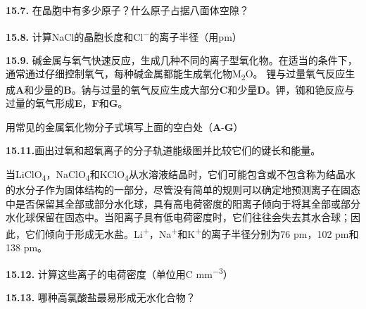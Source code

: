 \noindent\textbf{15.7.} 在晶胞中有多少原子？什么原子占据八面体空隙？

\noindent\textbf{15.8.}
计算NaCl的晶胞长度和Cl\textsuperscript{−}的离子半径（用pm）

\noindent\textbf{15.9.}
碱金属与氧气快速反应，生成几种不同的离子型氧化物。在适当的条件下，通常通过仔细控制氧气，每种碱金属都能生成氧化物M\textsubscript{2}O。
锂与过量氧气反应生成\textbf{A}和少量的\textbf{B}。钠与过量的氧气反应生成大部分\textbf{C}和少量\textbf{D}。钾，铷和铯反应与过量的氧气形成\textbf{E}，\textbf{F}和\textbf{G}。

用常见的金属氧化物分子式填写上面的空白处（\textbf{A}-\textbf{G}）

\noindent\textbf{15.11.}画出过氧和超氧离子的分子轨道能级图并比较它们的键长和能量。

当LiClO\textsubscript{4}，NaClO\textsubscript{4}和KClO\textsubscript{4}从水溶液结晶时，它们可能包含或不包含称为结晶水的水分子作为固体结构的一部分，尽管没有简单的规则可以确定地预测离子在固态中是否保留其全部或部分水化球，具有高电荷密度的阳离子倾向于将其全部或部分水化球保留在固态中。当阳离子具有低电荷密度时，它们往往会失去其水合球；因此，它们倾向于形成无水盐。Li\textsuperscript{+}，Na\textsuperscript{+}和K\textsuperscript{+}的离子半径分别为76 pm，102 pm和138 pm。

\noindent\textbf{15.12.} 计算这些离子的电荷密度（单位用C mm\textsuperscript{−3}）

\noindent\textbf{15.13.} 哪种高氯酸盐最易形成无水化合物？
